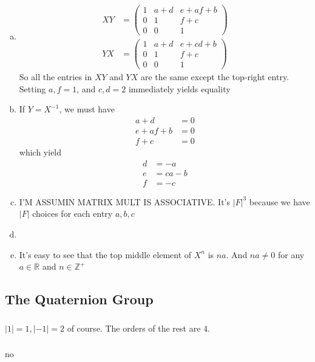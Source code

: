 \documentclass{article}
\newcommand{\ints}{\mathbb{Z}}
\newcommand{\reals}{\mathbb{R}}
\newcommand{\inv}[1]{ {#1}^{-1} }
\begin{document}
\subsubsection{}\label{ex4p11}
\begin{enumerate}[(a)]
\item \label{11a}
\begin{align*}
XY &= 
\begin{pmatrix}
1	&	a+d	&	e+af+b\\
0	&	1	&	f+c\\
0	&	0	&	1
\end{pmatrix}\\
YX &= 
\begin{pmatrix}
1	&	a+d	&	e+cd+b\\
0	&	1	&	f+c\\
0	&	0	&	1
\end{pmatrix}
\end{align*}
So all the entries in $XY$ and $YX$ are the same except the top-right entry. Setting $a,f=1$, and $c,d=2$ immediately yields equality
\item \label{11b}
If $Y = \inv{X}$, we must have
\begin{align*}
a+d &= 0\\
e + af + b &= 0\\
f+c &= 0
\end{align*}
which yield
\begin{align*}
d &= -a\\
e &= ca - b\\
f &= -c
\end{align*}
\item \label{11c}
I'M ASSUMIN MATRIX MULT IS ASSOCIATIVE. It's $|F|^3$ because we have $|F|$ choices for each entry $a,b,c$
\item \label{11d}
\item \label{11e}
It's easy to see that the top middle element of $X^n$ is $na$. And $na \neq 0$ for any $a \in \reals$ and $n \in \ints^+$
\end{enumerate}
\subsection{The Quaternion Group} 
\subsubsection{}
$|1| = 1, |-1| = 2$ of course. The orders of the rest are $4$.
\subsubsection{}
no
\end{document}
